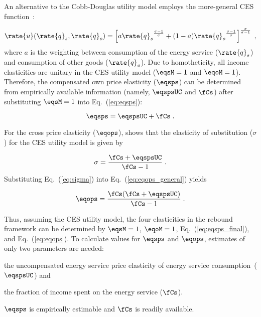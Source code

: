 An alternative to the Cobb-Douglas utility model employs
the more-general CES function~\citep{Lemoine:2020aa}:

\begin{equation}
  \rate{u}(\rate{q}_s,\rate{q}_o) =
      \left[ a {\rate{q}_s}^{\frac{\sigma-1}{\sigma}} 
            + (1-a) {\rate{q}_o}^{\frac{\sigma-1}{\sigma}} \right]
                                   ^{\frac{\sigma}{\sigma-1}} \; ,
\end{equation}
%
where $a$ is the weighting between
consumption of the energy service ($\rate{q}_s$)
and consumption of other goods ($\rate{q}_o$).
Due to homotheticity,
all income elasticities are unitary in the CES utility model
($\eqsM = 1$ and $\eqoM = 1$).
Therefore,
the compensated own price elasticity ($\eqsps$) can be
determined from empirically available information
(namely, $\eqspsUC$ and $\fCs$)
after substituting $\eqsM = 1$ into Eq.~(\ref{eq:eqsps}):

\begin{equation} \label{eq:eqsps_final}
  \eqsps = \eqspsUC + \fCs \; .
\end{equation}

For the cross price elasticity ($\eqops$),
\citet{Gortz1977} shows that
the elasticity of substitution ($\sigma$)
for the CES utility model is given by

\begin{equation} \label{eq:sigma}
  \sigma  = \frac{\fCs + \eqspsUC}{\fCs - 1} \; .
\end{equation}
%
Substituting Eq.~(\ref{eq:sigma}) into Eq.~(\ref{eq:eqops_general}) yields

\begin{equation} \label{eq:eqops}
  \eqops = \frac{\fCs (\fCs + \eqspsUC)}{\fCs - 1} \; .
\end{equation}

Thus, assuming the CES utility model,
the four elasticities in the rebound framework can be determined by
$\eqsM = 1$,
$\eqoM = 1$,
Eq.~(\ref{eq:eqsps_final}), and
Eq.~(\ref{eq:eqops}).
To calculate values for $\eqsps$ and $\eqops$,
estimates of only two parameters are needed:
%
\begin{enumerate*}[label={(\alph*)}]

  \item the uncompensated energy service price elasticity of energy service consumption~($\eqspsUC$) and

  \item the fraction of income spent on the energy service ($\fCs$).

\end{enumerate*}
%
$\eqsps$ is empirically estimable and $\fCs$ is readily available.
